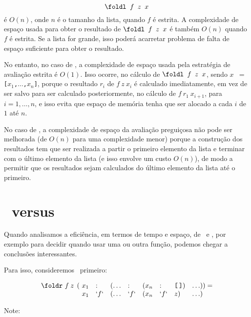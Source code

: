 \[ \texttt{\foldl\ $f$ $z$ $x$} \]
é $O(n)$, onde $n$ é o tamanho da lista, quando $f$ é estrita.  A
complexidade de espaço usada para obter o resultado de
$\texttt{\foldl\ $f$ $z$ $x$}$ é também $O(n)$ quando $f$ é
estrita. Se a lista for grande, isso poderá acarretar problema de
falta de espaço suficiente para obter o resultado.

No entanto, no caso de \foldl, a complexidade de espaço usada pela
estratégia de avaliação estrita é $O(1)$. Isso ocorre, no cálculo de
$\texttt{\foldl\ $f$ $z$ $x$}$, sendo {\tt $x$ $=$
  [$x_1$,$\ldots$,$x_n$]}, porque o resultado $r_i$ de $f\:z\:x_i$ é
calculado imediatamente, em vez de ser salvo para ser calculado
posteriormente, no cálculo de $f\: r_1\: x_{i+1}$, para
$i=1,\ldots,n$, e isso evita que espaço de memória tenha que ser
alocado a cada $i$ de $1$ até $n$.

No caso de \foldr, a complexidade de espaço da avaliação preguiçosa
não pode ser melhorada (de $O(n)$ para uma complexidade menor) porque
a construção dos resultados tem que ser realizada a partir o primeiro
elemento da lista e terminar com o último elemento da lista (e isso
envolve um custo $O(n)$), de modo a permitir que os resultados sejam
calculados do último elemento da lista até o primeiro.

\section{\foldr\ versus \foldl}
  
Quando analisamos a eficiência, em termos de tempo e espaço, de
\foldr\ e \foldl, por exemplo para decidir quando usar uma ou outra
função, podemos chegar a conclusões interessantes.

Para isso, consideremos \foldr\ primeiro:

{\ttfamily
\[ \begin{array}{lllllllll}
      \foldr\ f\: z\:\: ( &\!\!\!\! x_1 & :   & (\ldots & :   & (x_n & :   & \texttt{[\,]}) & \ldots)) = \\ 
                          &\!\!\!\! x_1 & `f` & (\ldots & `f` & (x_n & `f` & z)  & \ldots)
\end{array}
\]}

Note:

